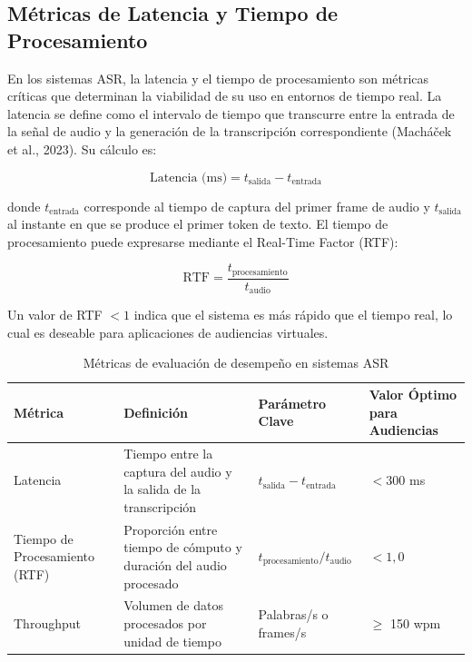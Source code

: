 \documentclass[12pt,a4paper,oneside]{report}
\begin{document}
\subsection{Métricas de Latencia y Tiempo de Procesamiento}

En los sistemas ASR, la latencia y el tiempo de procesamiento son métricas críticas que determinan la viabilidad de su uso en entornos de tiempo real. La latencia se define como el intervalo de tiempo que transcurre entre la entrada de la señal de audio y la generación de la transcripción correspondiente (Macháček et al., 2023). Su cálculo es:

\begin{equation}
\text{Latencia (ms)} = t_{\text{salida}} - t_{\text{entrada}}
\end{equation}

donde $t_{\text{entrada}}$ corresponde al tiempo de captura del primer frame de audio y $t_{\text{salida}}$ al instante en que se produce el primer token de texto. El tiempo de procesamiento puede expresarse mediante el Real-Time Factor (RTF):

\begin{equation}
\text{RTF} = \frac{t_{\text{procesamiento}}}{t_{\text{audio}}}
\end{equation}

Un valor de RTF $< 1$ indica que el sistema es más rápido que el tiempo real, lo cual es deseable para aplicaciones de audiencias virtuales.

\begin{table}[H]
\centering
\caption{Métricas de evaluación de desempeño en sistemas ASR}
\begin{tabular}{|p{2.5cm}|p{3.5cm}|p{3cm}|p{3cm}|}
\hline
\rowcolor{gray!20}
\textbf{Métrica} & \textbf{Definición} & \textbf{Parámetro Clave} & \textbf{Valor Óptimo para Audiencias} \\
\hline
Latencia & Tiempo entre la captura del audio y la salida de la transcripción & $t_{\text{salida}} - t_{\text{entrada}}$ & $< 300$ ms \\
\hline
Tiempo de Procesamiento (RTF) & Proporción entre tiempo de cómputo y duración del audio procesado & $t_{\text{procesamiento}} / t_{\text{audio}}$ & $< 1{,}0$ \\
\hline
Throughput & Volumen de datos procesados por unidad de tiempo & Palabras/s o frames/s & $\geq$ 150 wpm \\
\hline
\end{tabular}
\label{tab:latencia}
\end{table}
\end{document}
